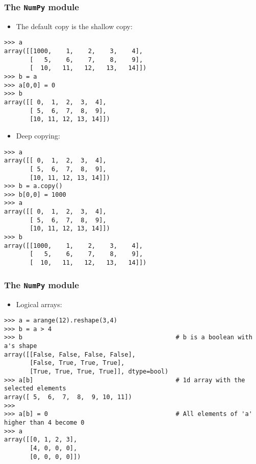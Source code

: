 \documentclass[handout]{beamer}
\numberwithin{equation}{section}
\begin{document}
\begin{frame}[fragile]
\frametitle{The {\tt NumPy} module}
\scriptsize
\begin{itemize}
\item The default copy is the shallow copy:
\end{itemize}

\begin{lstlisting}[name=ex2]
>>> a
array([[1000,    1,    2,    3,    4],
       [   5,    6,    7,    8,    9],
       [  10,   11,   12,   13,   14]])
>>> b = a
>>> a[0,0] = 0
>>> b
array([[ 0,  1,  2,  3,  4],
       [ 5,  6,  7,  8,  9],
       [10, 11, 12, 13, 14]])
\end{lstlisting}

\pause
\begin{itemize}
\item Deep copying:
\end{itemize}

\begin{lstlisting}[name=ex2]
>>> a
array([[ 0,  1,  2,  3,  4],
       [ 5,  6,  7,  8,  9],
       [10, 11, 12, 13, 14]])
>>> b = a.copy()
>>> b[0,0] = 1000
>>> a
array([[ 0,  1,  2,  3,  4],
       [ 5,  6,  7,  8,  9],
       [10, 11, 12, 13, 14]])
>>> b
array([[1000,    1,    2,    3,    4],
       [   5,    6,    7,    8,    9],
       [  10,   11,   12,   13,   14]])
\end{lstlisting}
\end{frame}


\begin{frame}[fragile]
\frametitle{The {\tt NumPy} module}
\begin{itemize}
\item Logical arrays:
\end{itemize}

\begin{lstlisting}[name=ex2]
>>> a = arange(12).reshape(3,4)
>>> b = a > 4
>>> b                                          # b is a boolean with a's shape
array([[False, False, False, False],
       [False, True, True, True],
       [True, True, True, True]], dtype=bool)
>>> a[b]                                       # 1d array with the selected elements
array([ 5,  6,  7,  8,  9, 10, 11])
>>>
>>> a[b] = 0                                   # All elements of 'a' higher than 4 become 0
>>> a
array([[0, 1, 2, 3],
       [4, 0, 0, 0],
       [0, 0, 0, 0]])
\end{lstlisting}
\end{frame}
\end{document}
